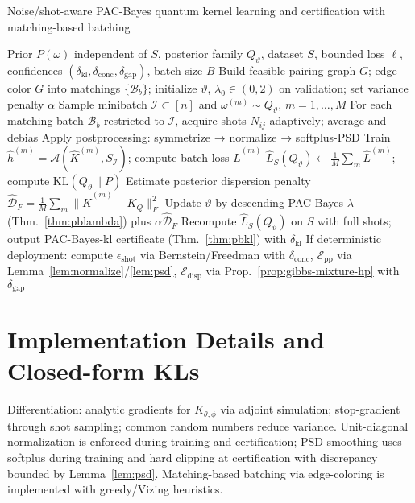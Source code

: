 \documentclass{article}
\begin{document}
\begin{algorithm}[t]
\caption{Noise/shot-aware PAC-Bayes quantum kernel learning and certification with matching-based batching}
\label{alg:train}
\begin{algorithmic}[1]
\Require Prior $P(\omega)$ independent of $S$, posterior family $Q_\vartheta$, dataset $S$, bounded loss $\ell$, confidences $(\delta_{\mathrm{kl}},\delta_{\mathrm{conc}},\delta_{\mathrm{gap}})$, batch size $B$
\State Build feasible pairing graph $G$; edge-color $G$ into matchings $\{\mathcal{B}_b\}$; initialize $\vartheta$, $\lambda_0\in(0,2)$ on validation; set variance penalty $\alpha$
  \State Sample minibatch $\mathcal{I}\subset[n]$ and $\omega^{(m)}\sim Q_\vartheta$, $m=1,\dots,M$
    \State For each matching batch $\mathcal{B}_b$ restricted to $\mathcal{I}$, acquire shots $N_{ij}$ adaptively; average and debias
    \State Apply postprocessing: symmetrize → normalize → softplus-PSD
    \State Train $\hat{h}^{(m)}=\mathcal{A}(\widehat{K}^{(m)},S_\mathcal{I})$; compute batch loss $\hat{L}^{(m)}$
  \EndFor
  \State $\hat{L}_S(Q_\vartheta)\gets \frac{1}{M}\sum_m \hat{L}^{(m)}$; compute $\mathrm{KL}(Q_\vartheta\|P)$
  \State Estimate posterior dispersion penalty $\widehat{\mathcal{D}}_F=\frac{1}{M}\sum_m \|\widehat{K}^{(m)}-K_Q\|_F^2$
  \State Update $\vartheta$ by descending PAC-Bayes-$\lambda$ (Thm.~\ref{thm:pblambda}) plus $\alpha \widehat{\mathcal{D}}_F$
\EndWhile
\State Recompute $\hat{L}_S(Q_\vartheta)$ on $S$ with full shots; output PAC-Bayes-kl certificate (Thm.~\ref{thm:pbkl}) with $\delta_{\mathrm{kl}}$
\State If deterministic deployment: compute $\epsilon_{\mathrm{shot}}$ via Bernstein/Freedman with $\delta_{\mathrm{conc}}$, $\mathcal{E}_{\mathrm{pp}}$ via Lemma~\ref{lem:normalize}/\ref{lem:psd}, $\mathcal{E}_{\mathrm{disp}}$ via Prop.~\ref{prop:gibbs-mixture-hp} with $\delta_{\mathrm{gap}}$
\end{algorithmic}
\end{algorithm}

\section{Implementation Details and Closed-form KLs}\label{sec:kl-closed}
Differentiation: analytic gradients for $K_{\theta,\phi}$ via adjoint simulation; stop-gradient through shot sampling; common random numbers reduce variance. Unit-diagonal normalization is enforced during training and certification; PSD smoothing uses softplus during training and hard clipping at certification with discrepancy bounded by Lemma~\ref{lem:psd}. Matching-based batching via edge-coloring is implemented with greedy/Vizing heuristics.
\end{document}
